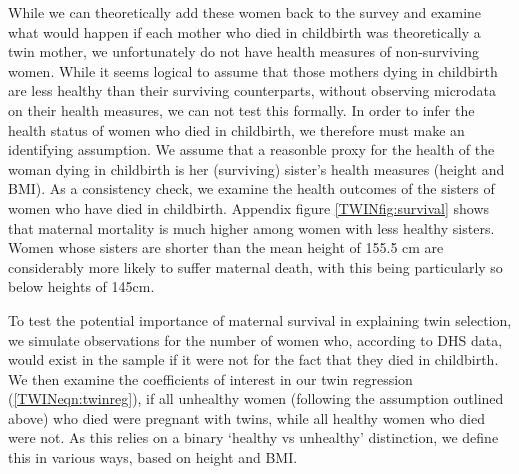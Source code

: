 While we can theoretically add these women back to the survey and examine
what would happen if each mother who died in childbirth was theoretically a 
twin mother, we unfortunately do not have health measures of non-surviving
women.  While it seems logical to assume that those mothers dying in childbirth 
are less healthy than their surviving counterparts, without observing microdata 
on their health measures, we can not test this formally.  In order to infer the 
health status of women who died in childbirth, we therefore must make an 
identifying assumption.  We assume that a reasonble proxy for the health of the 
woman dying in childbirth is her (surviving) sister's health measures (height 
and BMI).  As a consistency check, we examine the health outcomes of the sisters 
of women who have died in childbirth. Appendix figure \ref{TWINfig:survival} 
shows that maternal mortality is much higher among women with less healthy 
sisters.  Women whose sisters are shorter than the mean height of 155.5 cm are 
considerably more likely to suffer maternal death, with this being particularly 
so below heights of 145cm.

To test the potential importance of maternal survival in explaining twin 
selection, we simulate observations for the number of women who, according to 
DHS data, would exist in the sample if it were not for the fact that they died 
in childbirth.  We then examine the coefficients of interest in our twin 
regression (\ref{TWINeqn:twinreg}), if all unhealthy women (following the 
assumption outlined above) who died were pregnant with twins, while all healthy 
women who died were not.  As this relies on a binary `healthy vs unhealthy' 
distinction, we define this in various ways, based on height and BMI.  

